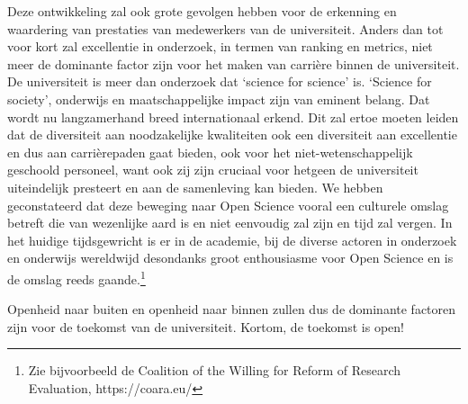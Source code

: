 \documentclass{jote-book}
\begin{document}
	Deze ontwikkeling zal ook grote gevolgen hebben voor de erkenning en waardering van prestaties van medewerkers van de universiteit. Anders dan tot voor kort zal excellentie in onderzoek, in termen van ranking en metrics, niet meer de dominante factor zijn voor het maken van carrière binnen de universiteit. De universiteit is meer dan onderzoek dat ‘science for science' is. ‘Science for society', onderwijs en maatschappelijke impact zijn van eminent belang. Dat wordt nu langzamerhand breed internationaal erkend. Dit zal ertoe moeten leiden dat de diversiteit aan noodzakelijke kwaliteiten ook een diversiteit aan excellentie en dus aan carrièrepaden gaat bieden, ook voor het niet-wetenschappelijk geschoold personeel, want ook zij zijn cruciaal voor hetgeen de universiteit uiteindelijk presteert en aan de samenleving kan bieden. We hebben geconstateerd dat deze beweging naar Open Science vooral een culturele omslag betreft die van wezenlijke aard is en niet eenvoudig zal zijn en tijd zal vergen. In het huidige tijdsgewricht is er in de academie, bij de diverse actoren in onderzoek en onderwijs wereldwijd desondanks groot enthousiasme voor Open Science en is de omslag reeds gaande.\footnote{Zie bijvoorbeeld de Coalition of the Willing for Reform of Research Evaluation, https://coara.eu/}



	Openheid naar buiten en openheid naar binnen zullen dus de dominante factoren zijn voor de toekomst van de universiteit. Kortom, de toekomst is open!
\end{document}
